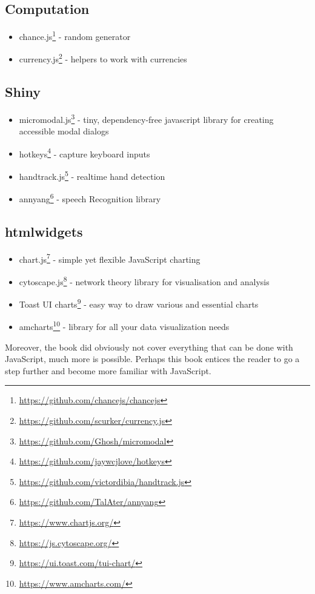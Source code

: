 \documentclass[
]{krantz}
\providecommand{\tightlist}{%
  \setlength{\itemsep}{0pt}\setlength{\parskip}{0pt}}
\renewcommand{\href}[2]{#2\footnote{\url{#1}}}
\begin{document}
\hypertarget{compute}{%
\subsection{Computation}\label{compute}}

\begin{itemize}
\tightlist
\item
  \href{https://github.com/chancejs/chancejs}{chance.js} - random generator
\item
  \href{https://github.com/scurker/currency.js}{currency.js} - helpers to work with currencies
\end{itemize}

\hypertarget{shiny}{%
\subsection{Shiny}\label{shiny}}

\begin{itemize}
\tightlist
\item
  \href{https://github.com/Ghosh/micromodal}{micromodal.js} - tiny, dependency-free javascript library for creating accessible modal dialogs
\item
  \href{https://github.com/jaywcjlove/hotkeys}{hotkeys} - capture keyboard inputs
\item
  \href{https://github.com/victordibia/handtrack.js}{handtrack.js} - realtime hand detection
\item
  \href{https://github.com/TalAter/annyang}{annyang} - speech Recognition library
\end{itemize}

\hypertarget{widgets}{%
\subsection{htmlwidgets}\label{widgets}}

\begin{itemize}
\tightlist
\item
  \href{https://www.chartjs.org/}{chart.js} - simple yet flexible JavaScript charting
\item
  \href{https://js.cytoscape.org/}{cytoscape.js} - network theory library for visualisation and analysis
\item
  \href{https://ui.toast.com/tui-chart/}{Toast UI charts} - easy way to draw various and essential charts
\item
  \href{https://www.amcharts.com/}{amcharts} - library for all your data visualization needs
\end{itemize}

Moreover, the book did obviously not cover everything that can be done with JavaScript, much more is possible. Perhaps this book entices the reader to go a step further and become more familiar with JavaScript.

  

\backmatter
\printindex
\end{document}
